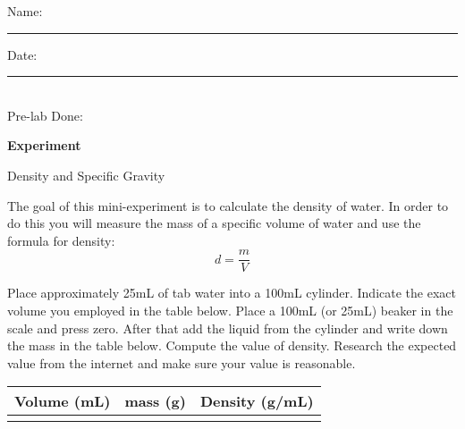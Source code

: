 \documentclass[main.tex]{subfiles}
\begin{document}
\clearpage\mbox{}\clearpage



\begin{multicols}{2}
\begin{tcolorbox}[enhanced jigsaw,breakable,size=title,
colback=mybrown!05,colframe=black,fonttitle=\bfseries,
title=STUDENT INFO,pad at break=1mm, break at=15cm/0pt ]
\vspace{0.2cm}
\noindent Name: \rule{5cm}{0.4pt}Date:\rule{1cm}{0.4pt}\\
Pre-lab Done: \quad
\end{tcolorbox}
\end{multicols}
\hfill
\vspace{0.2cm}
\begin{center}
{\large \bfseries 
Experiment
\par
\Huge
Density and Specific Gravity
\\[5pt] \par}
\vspace{0.2cm}
\end{center}
\par
\noindent
\uline{  \hfill \normalsize \hfill       }

\vspace{0.2cm}{\large \bfseries 1. Density of water}
The goal of this mini-experiment is to calculate the density of water. In order to do this you will measure the mass of a specific volume of water and use the formula for density:
\begin{equation*}
d=\frac{m}{V}
\end{equation*}
\begin{steps}
    \newstep[] Place approximately 25mL of tab water into a 100mL cylinder. Indicate the exact volume you employed in the table below.    
    \newstep[] Place a 100mL (or 25mL) beaker in the scale and press zero. After that add the liquid from the cylinder and write down the mass in the table below.
     \newstep[] Compute the value of density. Research the expected value from the internet and make sure your value is reasonable. 
\end{steps}
 
\begin{center}\begin{tabular}{ |p{4cm}|p{4cm}|p{4cm}|  }
\hline
    Volume (mL) &  mass (g) &  Density  (g/mL)         \\
\hline
   \vspace{0cm}\vspace{.5cm} &     &            \\
\hline
\end{tabular}\end{center}
 
\end{document}
